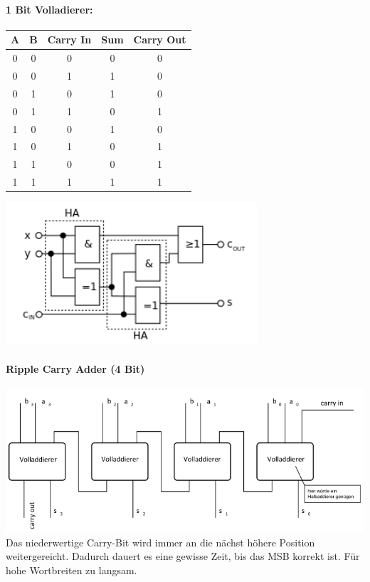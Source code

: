 \paragraph{1 Bit Volladierer:}
\begin{minipage}{0.35\textwidth}
	\begin{tabular}{|c | c | c | c | c |}
		\hline
		A & B & Carry In & Sum & Carry Out\\
		\hline
		0 & 0 & 0 & 0 & 0\\
		\hline
		0 & 0 & 1 & 1 & 0\\
		\hline
		0 & 1 & 0 & 1 & 0\\
		\hline
		0 & 1 & 1 & 0 & 1\\
		\hline
		1 & 0 & 0 & 1 & 0\\
		\hline
		1 & 0 & 1 & 0 & 1\\
		\hline
		1 & 1 & 0 & 0 & 1\\
		\hline
		1 & 1 & 1 & 1 & 1\\
		\hline
	\end{tabular}
\end{minipage}
\begin{minipage}{0.9\textwidth}
	\begin{flushleft}
		{\includegraphics[width=0.7\textwidth]{images/Arithmetik/volladdierer.png}}
	\end{flushleft}
\end{minipage}

\paragraph {Ripple Carry Adder (4 Bit)}
\includegraphics[width=1\textwidth]{images/Arithmetik/Ripple_Carry_Adder}
Das niederwertige Carry-Bit wird immer an die nächst höhere Position weitergereicht. Dadurch dauert es eine gewisse Zeit, bis das MSB korrekt ist. Für hohe Wortbreiten zu langsam.

